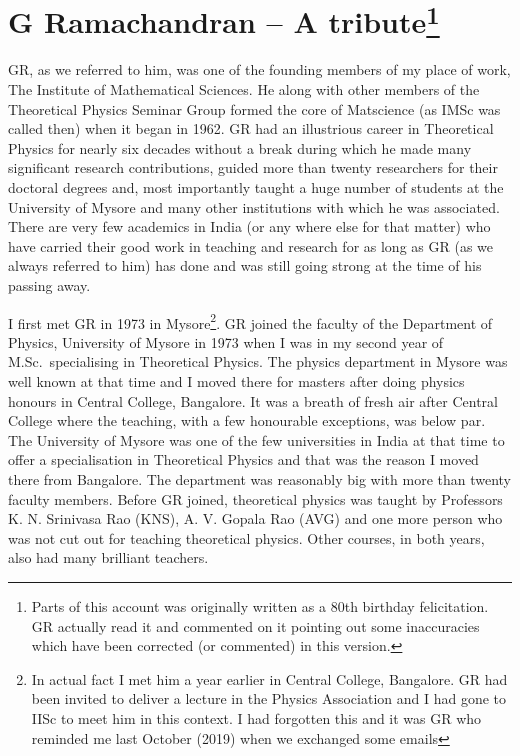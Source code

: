 \chapter[G Ramachandran – A tribute]{G Ramachandran – A tribute\footnote[*]{Parts of this account was originally written as a 80th birthday felicitation. GR actually read it and commented on it pointing out some inaccuracies which have been corrected (or commented) in this version.}}\label{chap24}



GR, as we referred to him, was one of the founding members of my place of work, The Institute of Mathematical Sciences. He along with other members of the Theoretical Physics Seminar Group formed the core of Matscience (as IMSc was called then) when it began in 1962. GR had an illustrious career in Theoretical Physics for nearly six decades without a break during which he made many significant research contributions, guided more than twenty researchers for their doctoral degrees and, most importantly taught a huge number of students at the University of Mysore and many other institutions with which he was associated. There are very few academics in India (or any where else for that matter) who have carried their good work in teaching and research for as long as GR (as we always referred to him) has done and was still going strong at the time of his passing away.

I first met GR in 1973 in Mysore\footnote{In actual fact I met him a year earlier in Central College, Bangalore. GR had been invited to deliver a lecture in the Physics Association and I had gone to IISc to meet him in this context. I had forgotten this and it was GR who reminded me last October (2019) when we exchanged some emails}. GR joined the faculty of the Department of Physics, University of Mysore in 1973 when I was in my second year of M.Sc.\ specialising in Theoretical Physics. The physics department in Mysore was well known at that time and I moved there for masters after doing physics honours in Central College, Bangalore. It was a breath of fresh air after Central College where the teaching, with a few honourable exceptions, was  below par. The University of Mysore was one of the few universities in India at that time to offer a specialisation in Theoretical Physics and that was the reason I moved there from Bangalore. The department was reasonably big with more than twenty faculty members. Before GR joined, theoretical physics was taught by Professors K. N. Srinivasa Rao (KNS), A. V. Gopala Rao (AVG) and one more person who was not cut out for teaching theoretical physics. Other courses, in both years, also had many brilliant teachers.

